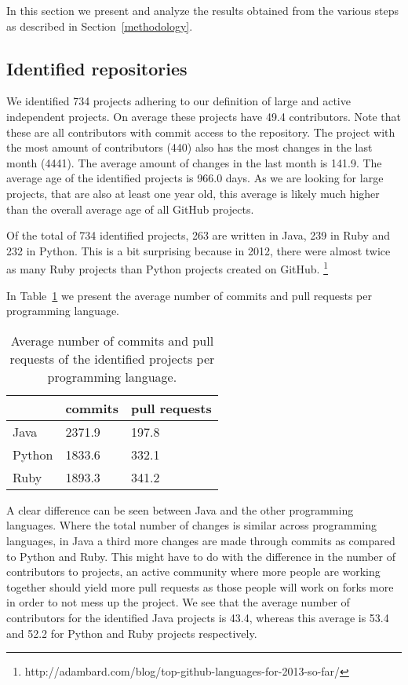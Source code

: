 In this section we present and analyze the results obtained from the various steps as described in Section~\ref{methodology}.

\subsection{Identified repositories}
We identified 734 projects adhering to our definition of large and active independent projects.
On average these projects have 49.4 contributors. 
Note that these are all contributors with commit access to the repository.
The project with the most amount of contributors (440) also has the most changes in the last month (4441).
The average amount of changes in the last month is 141.9.
The average age of the identified projects is 966.0 days. 
As we are looking for large projects, that are also at least one year old, this average is likely much higher than the overall average age of all GitHub projects.

Of the total of 734 identified projects, 263 are written in Java, 239 in Ruby and 232 in Python. 
This is a bit surprising because in 2012, there were almost twice as many Ruby projects than Python projects created on GitHub. \footnote{http://adambard.com/blog/top-github-languages-for-2013-so-far/}

In Table~\ref{tab:allChanges} we present the average number of commits and pull requests per programming language.
\begin{table}[h]
\begin{tabular}{ l | l l }
 & commits & pull requests\\
\hline
Java & 2371.9 & 197.8 \\
Python & 1833.6 & 332.1 \\
Ruby & 1893.3 & 341.2
\end{tabular}
\caption{Average number of commits and pull requests of the identified projects per programming language.}
\label{tab:allChanges}
\end{table}
A clear difference can be seen between Java and the other programming languages. 
Where the total number of changes is similar across programming languages, in Java a third more changes are made through commits as compared to Python and Ruby.
This might have to do with the difference in the number of contributors to projects, an active community where more people are working together should yield more pull requests as those people will work on forks more in order to not mess up the project. 
We see that the average number of contributors for the identified Java projects is 43.4, whereas this average is 53.4 and 52.2 for Python and Ruby projects respectively.


